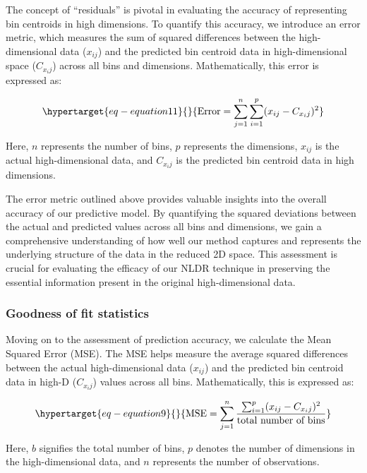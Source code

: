 \documentclass[
  12pt]{article}
\begin{document}
The concept of ``residuals'' is pivotal in evaluating the accuracy of
representing bin centroids in high dimensions. To quantify this
accuracy, we introduce an error metric, which measures the sum of
squared differences between the high-dimensional data (\(x_{ij}\)) and
the predicted bin centroid data in high-dimensional space (\(C_{x_ij}\))
across all bins and dimensions. Mathematically, this error is expressed
as:

\begin{equation}\protect\hypertarget{eq-equation11}{}{
\text{Error} = \sum_{j = 1}^{n}\sum_{i = 1}^{p} (x_{ij} - C_{x_ij})^2
}\label{eq-equation11}\end{equation}

Here, \(n\) represents the number of bins, \(p\) represents the
dimensions, \(x_{ij}\) is the actual high-dimensional data, and
\(C_{x_ij}\) is the predicted bin centroid data in high dimensions.

The error metric outlined above provides valuable insights into the
overall accuracy of our predictive model. By quantifying the squared
deviations between the actual and predicted values across all bins and
dimensions, we gain a comprehensive understanding of how well our method
captures and represents the underlying structure of the data in the
reduced 2D space. This assessment is crucial for evaluating the efficacy
of our NLDR technique in preserving the essential information present in
the original high-dimensional data.

\hypertarget{goodness-of-fit-statistics}{%
\subsubsection{Goodness of fit
statistics}\label{goodness-of-fit-statistics}}

Moving on to the assessment of prediction accuracy, we calculate the
Mean Squared Error (MSE). The MSE helps measure the average squared
differences between the actual high-dimensional data (\(x_{ij}\)) and
the predicted bin centroid data in high-D (\(C_{x_ij}\)) values across
all bins. Mathematically, this is expressed as:

\begin{equation}\protect\hypertarget{eq-equation9}{}{
\text{MSE} = \sum_{j = 1}^{n} \frac{\sum_{i = 1}^{p} (x_{ij} - C_{x_ij})^2}{\text{total number of bins}}
}\label{eq-equation9}\end{equation}

Here, \(b\) signifies the total number of bins, \(p\) denotes the number
of dimensions in the high-dimensional data, and \(n\) represents the
number of observations.
\end{document}

